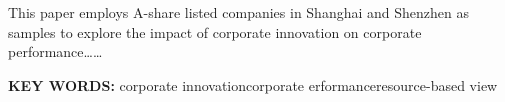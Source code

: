 \begin{enabstract}

    This paper employs A-share listed companies in Shanghai and Shenzhen as samples to explore the impact of corporate innovation on corporate performance……
    
    \textbf{KEY WORDS: }corporate innovation\hspace{1em}corporate erformance\hspace{1em}resource-based view
\end{enabstract}
